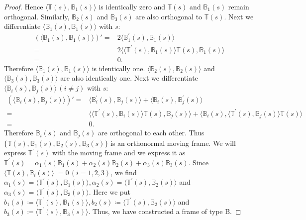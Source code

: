 \documentclass[a4paper]{amsart}
\theoremstyle{definition}
\theoremstyle{remark}
\newcommand{\BB}{\mathbb{B}}
\newcommand{\TT}{\mathbb{T}}
\numberwithin{equation}{section}
\begin{document}
\begin{proof}
Hence $\langle\mathbb{T}(s), \mathbb{B}_{1}(s)\rangle$ is identically zero and
 $\mathbb{T}(s)$ and $\mathbb{B}_1(s)$ remain orthogonal. Similarly, $\mathbb{B}_2(s)$ and $\mathbb{B}_3(s)$ are also orthogonal to $\mathbb{T}(s)$.
Next we differentiate $\langle \mathbb{B}_{1}(s),\mathbb{B}_1(s)\rangle$ with $s$:
\begin{align*}
\left( \langle \mathbb{B}_{1}(s), \mathbb{B}_1(s) \rangle \right)' 
= &2\langle\mathbb{B}^{\prime}_{1}(s), \mathbb{B}_{1}(s)\rangle\\
=&2\langle\langle\mathbb{T}^{\prime}(s), \mathbb{B}_{1}(s)\rangle\mathbb{T}(s), \mathbb{B}_{1}(s)\rangle\\
=&0.
\end{align*}
Therefore $\langle\mathbb{B}_{1}(s), \BB_{1}(s)\rangle$ is identically one. $\langle\mathbb{B}_{2}(s),\mathbb{B}_{2}(s)\rangle$ and $\langle\mathbb{B}_{3}(s),\mathbb{B}_{3}(s)\rangle$ are also identically one. 
Next we differentiate $\langle \mathbb{B}_{i}(s),\mathbb{B}_{j}(s)\rangle\,(i\neq j)$ with $s$:
\begin{align*}
\left( \langle \mathbb{B}_{i}(s), \mathbb{B}_{j}(s) \rangle \right)' 
= &\langle\mathbb{B}^{\prime}_{i}(s), \mathbb{B}_{j}(s)\rangle+\langle\mathbb{B}_{i}(s), \mathbb{B}^{\prime}_{j}(s)\rangle\\
=&\langle\langle\mathbb{T}^{\prime}(s), \mathbb{B}_{i}(s)\rangle\mathbb{T}(s), \mathbb{B}_{j}(s)\rangle+\langle\mathbb{B}_{i}(s), \langle\mathbb{T}^{\prime}(s), \mathbb{B}_{j}(s)\rangle\mathbb{T}(s)\rangle\\
=&0.
\end{align*}
Therefore $\mathbb{B}_{i}(s)$ and $\mathbb{B}_{j}(s)$ are orthogonal to each other.
Thus $\{\mathbb{T}(s), \mathbb{B}_{1}(s), \mathbb{B}_{2}(s), \mathbb{B}_{3}(s)\}$ is an orthonormal moving frame. We will express $\mathbb{T}^{\prime}(s)$ with the moving frame and we express it as $\mathbb{T}^{\prime}(s)=\alpha_{1}(s)\mathbb{B}_{1}(s)+\alpha_{2}(s)\mathbb{B}_{2}(s)+\alpha_{3}(s)\mathbb{B}_{3}(s)$. Since $\langle\TT(s), \BB_{i}(s)\rangle^{\prime}=0\, (i=1,2,3)$, we find $\alpha_{1}(s)=\langle\mathbb{T}^{\prime}(s), \mathbb{B}_{1}(s)\rangle, \alpha_{2}(s)=\langle\mathbb{T}^{\prime}(s), \mathbb{B}_{2}(s)\rangle$ and $\alpha_{3}(s)=\langle\mathbb{T}^{\prime}(s), \mathbb{B}_{3}(s)\rangle$. Here we put $b_{1}(s)\coloneqq \langle\mathbb{T}^{\prime}(s), \mathbb{B}_{1}(s)\rangle, b_{2}(s)\coloneqq \langle\mathbb{T}^{\prime}(s), \mathbb{B}_{2}(s)\rangle$ and $b_{3}(s)\coloneqq \langle\mathbb{T}^{\prime}(s), \mathbb{B}_{3}(s)\rangle$. Thus, we have constructed a frame of type B.
\end{proof}
\end{document}
